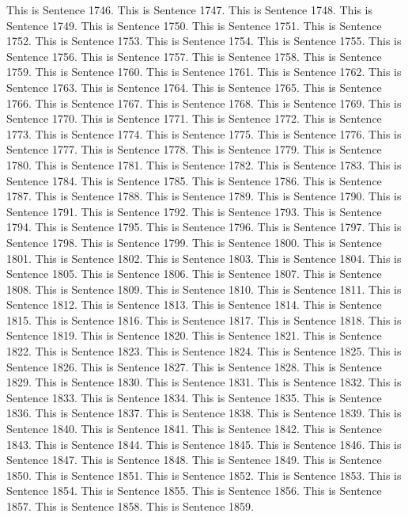 \documentclass{article}
\begin{document}
This is Sentence 1746.
This is Sentence 1747.
This is Sentence 1748.
This is Sentence 1749.
This is Sentence 1750.
This is Sentence 1751.
This is Sentence 1752.
This is Sentence 1753.
This is Sentence 1754.
This is Sentence 1755.
This is Sentence 1756.
This is Sentence 1757.
This is Sentence 1758.
This is Sentence 1759.
This is Sentence 1760.
This is Sentence 1761.
This is Sentence 1762.
This is Sentence 1763.
This is Sentence 1764.
This is Sentence 1765.
This is Sentence 1766.
This is Sentence 1767.
This is Sentence 1768.
This is Sentence 1769.
This is Sentence 1770.
This is Sentence 1771.
This is Sentence 1772.
This is Sentence 1773.
This is Sentence 1774.
This is Sentence 1775.
This is Sentence 1776.
This is Sentence 1777.
This is Sentence 1778.
This is Sentence 1779.
This is Sentence 1780.
This is Sentence 1781.
This is Sentence 1782.
This is Sentence 1783.
This is Sentence 1784.
This is Sentence 1785.
This is Sentence 1786.
This is Sentence 1787.
This is Sentence 1788.
This is Sentence 1789.
This is Sentence 1790.
This is Sentence 1791.
This is Sentence 1792.
This is Sentence 1793.
This is Sentence 1794.
This is Sentence 1795.
This is Sentence 1796.
This is Sentence 1797.
This is Sentence 1798.
This is Sentence 1799.
This is Sentence 1800.
This is Sentence 1801.
This is Sentence 1802.
This is Sentence 1803.
This is Sentence 1804.
This is Sentence 1805.
This is Sentence 1806.
This is Sentence 1807.
This is Sentence 1808.
This is Sentence 1809.
This is Sentence 1810.
This is Sentence 1811.
This is Sentence 1812.
This is Sentence 1813.
This is Sentence 1814.
This is Sentence 1815.
This is Sentence 1816.
This is Sentence 1817.
This is Sentence 1818.
This is Sentence 1819.
This is Sentence 1820.
This is Sentence 1821.
This is Sentence 1822.
This is Sentence 1823.
This is Sentence 1824.
This is Sentence 1825.
This is Sentence 1826.
This is Sentence 1827.
This is Sentence 1828.
This is Sentence 1829.
This is Sentence 1830.
This is Sentence 1831.
This is Sentence 1832.
This is Sentence 1833.
This is Sentence 1834.
This is Sentence 1835.
This is Sentence 1836.
This is Sentence 1837.
This is Sentence 1838.
This is Sentence 1839.
This is Sentence 1840.
This is Sentence 1841.
This is Sentence 1842.
This is Sentence 1843.
This is Sentence 1844.
This is Sentence 1845.
This is Sentence 1846.
This is Sentence 1847.
This is Sentence 1848.
This is Sentence 1849.
This is Sentence 1850.
This is Sentence 1851.
This is Sentence 1852.
This is Sentence 1853.
This is Sentence 1854.
This is Sentence 1855.
This is Sentence 1856.
This is Sentence 1857.
This is Sentence 1858.
This is Sentence 1859.
\end{document}
